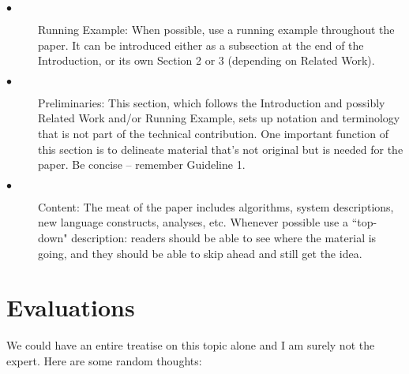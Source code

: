 \documentclass[10pt,twocolumn]{article}
\begin{document}
\begin{description}
  \item[$\bullet$]  Running Example: When possible, use a running example throughout the paper. It can be introduced either as a subsection at the end of the Introduction, or its own Section 2 or 3 (depending on Related Work).
  \item[$\bullet$]  Preliminaries: This section, which follows the Introduction and possibly Related Work and/or Running Example, sets up notation and terminology that is not part of the technical contribution. One important function of this section is to delineate material that's not original but is needed for the paper. Be concise -- remember Guideline 1.
    \item[$\bullet$] Content: The meat of the paper includes algorithms, system descriptions, new language constructs, analyses, etc. Whenever possible use a ``top-down" description: readers should be able to see where the material is going, and they should be able to skip ahead and still get the idea.
\end{description}


\section{Evaluations} \label{eval}

We could have an entire treatise on this topic alone and I am surely not the expert. Here are some random thoughts:
\end{document}
